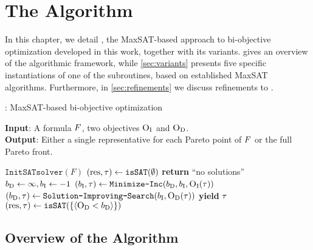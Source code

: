 \chapter{The \algname{} Algorithm\label{chap:approach}}

In this chapter, we detail \algname{}, the MaxSAT-based approach to bi-objective optimization developed in this work, together with its variants.
 gives an overview of the algorithmic framework, while \cref{sec:variants} presents five specific instantiations of one of the subroutines, based on established MaxSAT algorithms.
Furthermore, in \cref{sec:refinements} we discuss refinements to \algname{}.

\begin{algorithm}[t]
  \caption{\algname{}: MaxSAT-based  bi-objective optimization} %
  \label{alg:base-algorithm}
  \textbf{Input}: A formula $F$, two objectives $\textsc{O}_{\text{I}}$ and $\textsc{O}_{\text{D}}$. \\
  \textbf{Output}: Either a single representative for each Pareto point of $F$ or the full Pareto front.

  \begin{algorithmic}[1]
    \STATE $\texttt{InitSATsolver}(F)$ \label{l:init-solv} 
    \STATE $(\text{res}, \tau) \gets \texttt{isSAT}(\emptyset)$ \quad{}\label{l:sols} 
    \IF{$\res=\unsat$}
      \STATE \textbf{return} ``no solutions''
    \ENDIF
    \STATE $b_{\text{D}} \gets \infty, b_{\text{I}} \gets -1$ \label{l:bounds}
    \WHILE{$\res = \sat$} \label{l:loopstart}
      \STATE $(b_{\text{I}}, \tau) \gets \texttt{Minimize-\allowbreak{}Inc}(b_{\text{D}} , b_{\text{I}}, \textsc{O}_{\text{I}}(\tau))$  \quad{}\label{l:minim1}
      \STATE $(b_{\text{D}}, \tau) \gets  \texttt{Solution-\allowbreak{}Improving-\allowbreak{}Search}(b_{\text{I}} , \textsc{O}_{\text{D}}(\tau))$  \quad{}\label{l:minim2}
      \STATE \textbf{yield} $\tau$  \quad{}\label{ln:stage3} 
      \STATE $(\text{res}, \tau) \gets \texttt{isSAT}(\{\langle \textsc{O}_{\text{D}} < b_{\text{D}} \rangle\})$\label{l:endL}
    \ENDWHILE
  \end{algorithmic}
\end{algorithm}

\section{Overview of the Algorithm\label{sec:algorithm}}

